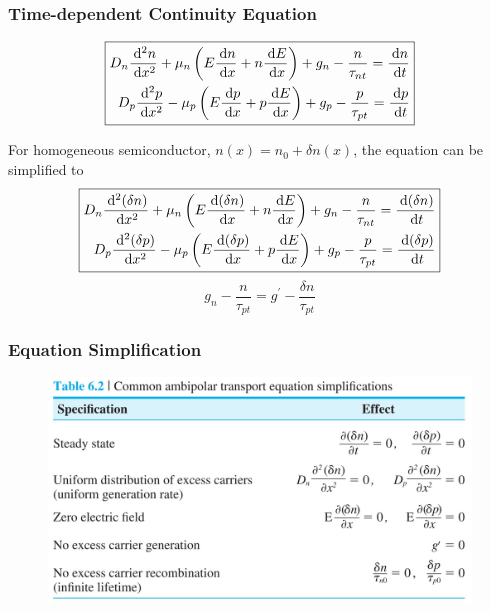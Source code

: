 \documentclass{beamer}
\begin{document}
    \begin{frame} \frametitle{Time-dependent Continuity Equation}
        \begin{equation*}
            \boxed{
                \begin{aligned}
                    D_n \frac{\: \mathrm{d}^2 n}{\: \mathrm{d} x^2} + \mu_n \left( E \frac{\: \mathrm{d} n}{\: \mathrm{d} x} + n \frac{\: \mathrm{d} E}{\: \mathrm{d} x}  \right) + g_n - \frac{n}{\tau_{nt}} = \frac{\: \mathrm{d} n}{\: \mathrm{d} t} \\
                    D_p \frac{\: \mathrm{d}^2 p}{\: \mathrm{d} x^2} - \mu_p \left( E \frac{\: \mathrm{d} p}{\: \mathrm{d} x} + p \frac{\: \mathrm{d} E}{\: \mathrm{d} x}  \right) + g_p - \frac{p}{\tau_{pt}} = \frac{\: \mathrm{d} p}{\: \mathrm{d} t} \\
                \end{aligned}
            }
        \end{equation*}
        \par For homogeneous semiconductor, $n(x) = n_0 + \delta n(x)$, the equation can be simplified to 
        \begin{equation*}
            \boxed{
                \begin{aligned}
                    D_n \frac{\: \mathrm{d}^2 (\delta n)}{\: \mathrm{d} x^2} + \mu_n \left( E \frac{\: \mathrm{d} (\delta n)}{\: \mathrm{d} x} + n \frac{\: \mathrm{d} E}{\: \mathrm{d} x}  \right) + g_n - \frac{n}{\tau_{nt}} = \frac{\: \mathrm{d} (\delta n)}{\: \mathrm{d} t} \\
                    D_p \frac{\: \mathrm{d}^2 (\delta p)}{\: \mathrm{d} x^2} - \mu_p \left( E \frac{\: \mathrm{d} (\delta p)}{\: \mathrm{d} x} + p \frac{\: \mathrm{d} E}{\: \mathrm{d} x}  \right) + g_p - \frac{p}{\tau_{pt}} = \frac{\: \mathrm{d} (\delta p)}{\: \mathrm{d} t} \\
                \end{aligned}
            }
        \end{equation*}
        \begin{equation*}
            \boxed{
                g_n - \frac{n}{\tau_{pt}} = g^\prime - \frac{\delta n}{\tau_{pt} }  
            }
        \end{equation*}
    \end{frame}

    \begin{frame} \frametitle{Equation Simplification}
        \begin{figure}[H]
            \centering
            \includegraphics[width=0.9\linewidth]{Equation-simplification.jpg}
            \label{fig:Equation-simplification.jpg}
        \end{figure}
    \end{frame}
\end{document}
